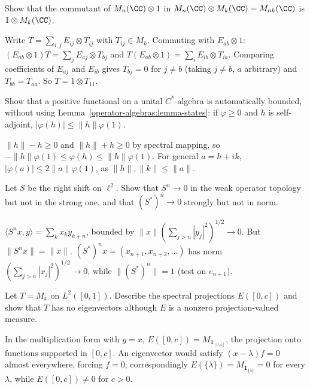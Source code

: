 \begin{exercise}\label{operator-algebras:exercise-commutant-matrices}
Show that the commutant of $M_n(\CC) \otimes 1$ in $M_n(\CC) \otimes M_k(\CC) = M_{nk}(\CC)$ is $1 \otimes M_k(\CC)$.
\end{exercise}

\begin{solution}
Write $T = \sum_{i,j}E_{ij} \otimes T_{ij}$ with $T_{ij} \in M_k$. Commuting with $E_{ab} \otimes 1$: $(E_{ab} \otimes 1)T = \sum_jE_{aj} \otimes T_{bj}$ and $T(E_{ab} \otimes 1) = \sum_iE_{ib} \otimes T_{ia}$. Comparing coefficients of
$E_{aj}$ and $E_{ib}$ gives $T_{bj} = 0$ for $j \neq b$ (taking $j \neq b$, $a$ arbitrary) and $T_{bb} = T_{aa}$. So $T = 1 \otimes T_{11}$.
\end{solution}

\begin{exercise}\label{operator-algebras:exercise-positive-functional-continuous}
Show that a positive functional on a unital $C^*$-algebra is automatically bounded, without using Lemma~\ref{operator-algebras:lemma-states}: if $\varphi \geq 0$ and $h$ is self-adjoint, $|\varphi(h)| \leq \|h\|\varphi(1)$.
\end{exercise}

\begin{solution}
$\|h\| - h \geq 0$ and $\|h\| + h \geq 0$ by spectral mapping, so $-\|h\|\varphi(1) \leq \varphi(h) \leq \|h\|\varphi(1)$. For general $a = h + ik$, $|\varphi(a)| \leq 2\|a\|\varphi(1)$, as $\|h\|, \|k\| \leq \|a\|$.
\end{solution}

\begin{exercise}\label{operator-algebras:exercise-shift-topologies}
Let $S$ be the right shift on $\ell^2$. Show that $S^n \to 0$ in the weak operator topology but not in the strong one, and that $(S^*)^n \to 0$ strongly but not in norm.
\end{exercise}

\begin{solution}
$\langle S^nx, y\rangle = \sum_kx_ky_{k+n}$, bounded by $\|x\|(\sum_{j > n}|y_j|^2)^{1/2} \to 0$. But $\|S^nx\| = \|x\|$. $(S^*)^nx = (x_{n+1}, x_{n+2}, \ldots)$ has norm $(\sum_{j > n}|x_j|^2)^{1/2} \to 0$, while $\|(S^*)^n\| = 1$ (test on
$e_{n+1}$).
\end{solution}

\begin{exercise}\label{operator-algebras:exercise-spectral-projection}
Let $T = M_x$ on $L^2([0, 1])$. Describe the spectral projections $E([0, c])$ and show that $T$ has no eigenvectors although $E$ is a nonzero projection-valued measure.
\end{exercise}

\begin{solution}
In the multiplication form with $g = x$, $E([0, c]) = M_{\mathbf{1}_{[0,c]}}$, the projection onto functions supported in $[0, c]$. An eigenvector would satisfy $(x - \lambda)f = 0$ almost everywhere, forcing $f = 0$; correspondingly
$E(\{\lambda\}) = M_{\mathbf{1}_{\{\lambda\}}} = 0$ for every $\lambda$, while $E([0, c]) \neq 0$ for $c > 0$.
\end{solution}
